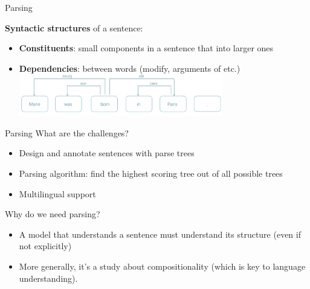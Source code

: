 \documentclass[usenames,dvipsnames,notes,11pt,aspectratio=169,hyperref={colorlinks=true, linkcolor=blue}]{beamer}
\begin{document}
\begin{frame}
    {Parsing}

        \textbf{Syntactic structures} of a sentence:\\
            \begin{itemize}
                \item {\bf Constituents}: small components in a sentence that  into larger ones\\[1ex]
                \pause
            \item {\bf Dependencies}:  between words (modify, arguments of etc.)\\[1ex]
                    \includegraphics[width=0.7\textwidth]{figures/dep-parse}
            \end{itemize}
\end{frame}

\begin{frame}
    {Parsing}
    What are the challenges?\\\pause
    \begin{itemize}
        \item Design and annotate sentences with parse trees 
        \item Parsing algorithm: find the highest scoring tree out of all possible trees
        \item Multilingual support
    \end{itemize}

    \pause\bigskip
    Why do we need parsing?\\
    \begin{itemize}
        \item A model that understands a sentence must understand its structure (even if not explicitly)
        \item More generally, it's a study about compositionality (which is key to language understanding).
    \end{itemize}
\end{frame}
\end{document}
